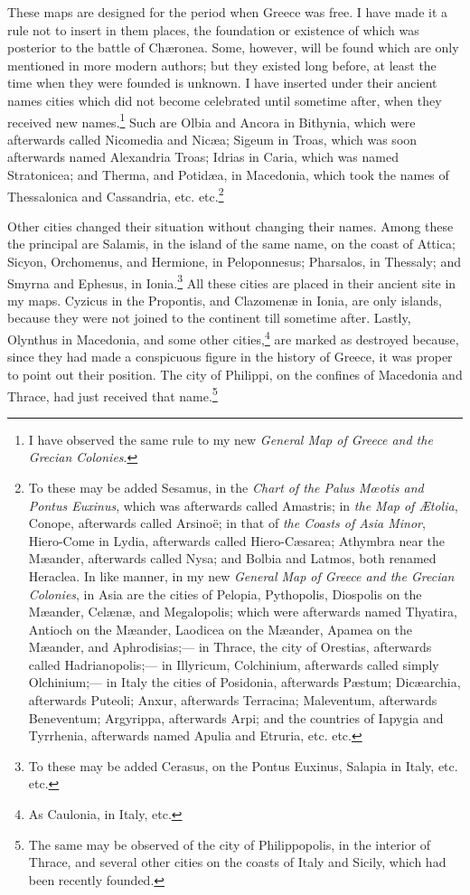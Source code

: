 \documentclass[a4paper, 11pt, oneside, polutonikogreek, english]{article}
\begin{document}
These maps are designed for the period when Greece was free. I have made it a rule not to insert in them places, the foundation or existence of which was posterior to the battle of Chæronea. Some, however, will be found which are only mentioned in more modern authors; but they existed long before, at least the time when they were founded is unknown. I have inserted under their ancient names cities which did not become celebrated until sometime after, when they received new names.\footnote{I have observed the same rule to my new \emph{General Map of Greece and the Grecian Colonies}.} Such are Olbia and Ancora in Bithynia, which were afterwards called Nicomedia and Nicæa; Sigeum in Troas, which was soon afterwards named Alexandria Troas; Idrias in Caria, which was named Stratonicea; and Therma, and Potidæa, in Macedonia, which took the names of Thessalonica and Cassandria, etc. etc.\footnote{To these may be added Sesamus, in the \emph{Chart of the Palus Mœotis and Pontus Euxinus}, which was afterwards called Amastris; in \emph{the Map of Ætolia}, Conope, afterwards called Arsinoë; in that of \emph{the Coasts of Asia Minor}, Hiero-Come in Lydia, afterwards called Hiero-Cæsarea; Athymbra near the Mæander, afterwards called Nysa; and Bolbia and Latmos, both renamed Heraclea. In like manner, in my new \emph{General Map of Greece and the Grecian Colonies}, in Asia are the cities of Pelopia, Pythopolis, Diospolis on the Mæander, Celænæ, and Megalopolis; which were afterwards named Thyatira, Antioch on the Mæander, Laodicea on the Mæander, Apamea on the Mæander, and Aphrodisias;--- in Thrace, the city of Orestias, afterwards called Hadrianopolis;--- in Illyricum, Colchinium, afterwards called simply Olchinium;--- in Italy the cities of Posidonia, afterwards Pæstum; Dicæarchia, afterwards Puteoli; Anxur, afterwards Terracina; Maleventum, afterwards Beneventum; Argyrippa, afterwards Arpi; and the countries of Iapygia and Tyrrhenia, afterwards named Apulia and Etruria, etc. etc.}

Other cities changed their situation without changing their names. Among these the principal are Salamis, in the island of the same name, on the coast of Attica; Sicyon, Orchomenus, and Hermione, in Peloponnesus; Pharsalos, in Thessaly; and Smyrna and Ephesus, in Ionia.\footnote{To these may be added Cerasus, on the Pontus Euxinus, Salapia in Italy, etc. etc.} All these cities are placed in their ancient site in my maps. Cyzicus in the Propontis, and Clazomenæ in Ionia, are only islands, because they were not joined to the continent till sometime after. Lastly, Olynthus in Macedonia, and some other cities,\footnote{As Caulonia, in Italy, etc.} are marked as destroyed because, since they had made a conspicuous figure in the history of Greece, it was proper to point out their position. The city of Philippi, on the confines of Macedonia and Thrace, had just received that name.\footnote{The same may be observed of the city of Philippopolis, in the interior of Thrace, and several other cities on the coasts of Italy and Sicily, which had been recently founded.}
\end{document}
